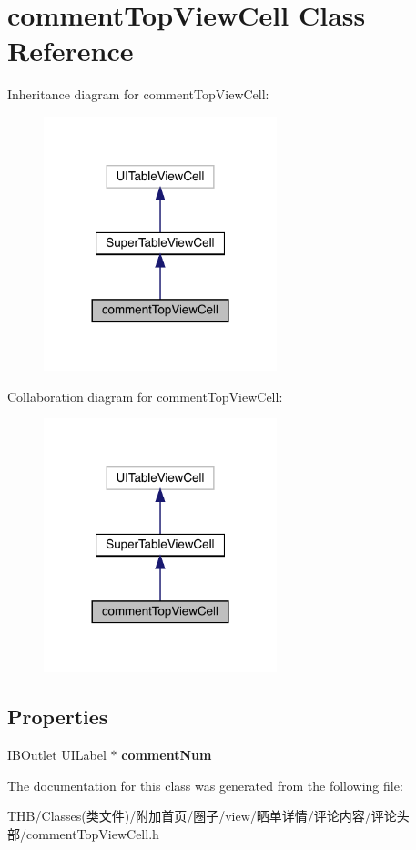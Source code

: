 \hypertarget{interfacecomment_top_view_cell}{}\section{comment\+Top\+View\+Cell Class Reference}
\label{interfacecomment_top_view_cell}


Inheritance diagram for comment\+Top\+View\+Cell\+:\nopagebreak
\begin{figure}[H]
\begin{center}
\leavevmode
\includegraphics[width=192pt]{interfacecomment_top_view_cell__inherit__graph}
\end{center}
\end{figure}


Collaboration diagram for comment\+Top\+View\+Cell\+:\nopagebreak
\begin{figure}[H]
\begin{center}
\leavevmode
\includegraphics[width=192pt]{interfacecomment_top_view_cell__coll__graph}
\end{center}
\end{figure}
\subsection*{Properties}
\begin{DoxyCompactItemize}
\item 
\mbox{\label{interfacecomment_top_view_cell_a1a609b2947a199d84cdba1cfb24153c6}} 
I\+B\+Outlet U\+I\+Label $\ast$ {\bfseries comment\+Num}
\end{DoxyCompactItemize}


The documentation for this class was generated from the following file\+:\begin{DoxyCompactItemize}
\item 
T\+H\+B/\+Classes(类文件)/附加首页/圈子/view/晒单详情/评论内容/评论头部/comment\+Top\+View\+Cell.\+h\end{DoxyCompactItemize}
